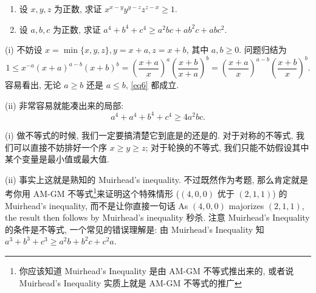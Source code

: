 \begin{prob}
\label{prob:prob-5}
\begin{enumerate}[label=(\roman*)]
\item 设 $x,y,z$ 为正数, 求证 $x^{x-y}y^{y-z}z^{z-x} \ge 1$.
\item 设 $a,b,c$ 为正数, 求证 $a^4 + b^4 + c^4 \ge a^2bc + ab^2c + abc^2$.
\end{enumerate}
\end{prob}

\begin{soln}
(i) 不妨设 $x=\min\{x,y,z\}, y=x+a, z=x+b$, 其中 $a,b \ge 0$.
问题归结为
\begin{equation}
\label{eq6}
1 \le x^{-a}(x+a)^{a-b}(x+b)^b =
\left(\frac{x+a}{x}\right)^a\left(\frac{x+b}{x+a}\right)^b =
\left(\frac{x+a}{x}\right)^{a-b}\left(\frac{x+b}{x}\right)^b.
\end{equation}
容易看出, 无论 $a \ge b$ 还是 $a \le b$, \cref{eq6} 都成立.

(ii) 非常容易就能凑出来的局部:
\begin{equation}
\label{eq7}
a^4 + a^4 + b^4 + c^4 \ge 4a^2bc.
\end{equation}
\end{soln}

\begin{rem*}
(i) 做不等式的时候, 我们一定要搞清楚它到底是的还是的.
对于对称的不等式, 我们可以直接不妨排好一个序 $x \ge y \ge z$;
对于轮换的不等式, 我们只能不妨假设其中某个变量是最小值或最大值.

(ii) 事实上这就是熟知的 Muirhead's inequality.
不过既然作为考题, 那么肯定就是考你用 AM-GM 不等式\footnote{你应该知道
Muirhead's Inequality 是由 AM-GM 不等式推出来的,
或者说 Muirhead's Inequality 实质上就是 AM-GM 不等式的推广}来证明这个特殊情形
($(4,0,0)$ 优于 $(2,1,1)$) 的 Muirhead's inequality,
而不是让你直接一句话
As $(4,0,0)$ majorizes $(2,1,1)$, the result then follows by Muirhead's inequality 秒杀.
注意 Muirhead's Inequality 的条件是不等式,
一个常见的错误理解是: 由 Muirhead's Inequality 知 $a^3 + b^3 + c^3 \ge a^2b + b^2c + c^2a$.
\end{rem*}

\newpage

